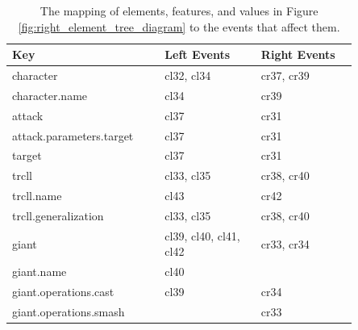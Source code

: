 \begin{table}[ht]
\centering
\caption{The mapping of elements, features, and values in Figure \ref{fig:right_element_tree_diagram} to the events that affect them.}
\label{tab:keyeventsmap}
\begin{sffamily}
	\begin{tabular}{|m{0.36\linewidth}|m{0.245\linewidth}|m{0.245\linewidth}|}
		\hline
		\textbf{Key} & \textbf{Left Events} & \textbf{Right Events} \\ \hline
		character                          & cl32, cl34                                & cr37, cr39                                 \\ \hline
		character.name                     & cl34                                      & cr39                                       \\ \hline
		attack                             & cl37                                      & cr31                                       \\ \hline
		attack.parameters.target           & cl37                                      & cr31                                       \\ \hline
		target                             & cl37                                      & cr31                                       \\ \hline
		trcll                              & cl33, cl35                                & cr38, cr40                                 \\ \hline
		trcll.name                         & cl43                                      & cr42                                       \\ \hline
		trcll.generalization               & cl33, cl35                                & cr38, cr40                                 \\ \hline
		giant                              & cl39, cl40, cl41, cl42                    & cr33, cr34                                 \\ \hline
		giant.name                         & cl40                                      &                                            \\ \hline
		giant.operations.cast              & cl39                                      & cr34                                       \\ \hline
		giant.operations.smash             &                                           & cr33                                       \\ \hline

\end{tabular}
\end{sffamily}
\end{table}
